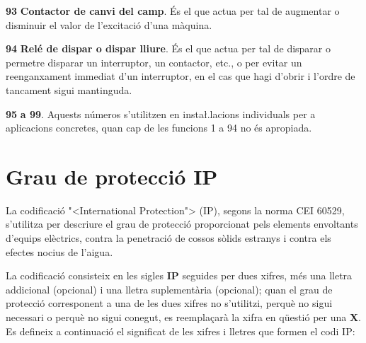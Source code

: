 \begin{multicols}{2}
\begin{list}{}
\item[\textbf{93}]   
\textbf{Contactor de canvi del camp}. \'{E}s el
que actua per tal de augmentar o disminuir el valor de l'excitaci\'{o}
d'una m\`{a}quina.

\item[\textbf{94}]   
\textbf{Rel\'{e} de dispar o dispar
lliure}. \'{E}s el que actua per tal de disparar o permetre disparar un
interruptor, un contactor, etc., o per evitar un reenganxament
immediat d'un interruptor, en el cas que hagi d'obrir i l'ordre de
tancament sigui mantinguda.

\item[\textbf{95}] \textbf{a 99}. Aquests n\'{u}meros s'utilitzen en insta{\l.l}acions
individuals per a aplicacions concretes, quan cap de les funcions 1
a 94 no \'{e}s apropiada.

\end{list}
\end{multicols}


\section{Grau de protecci\'{o} IP}   

La codificaci\'{o} {"<}International Protection{">} (\textsf{IP}), segons la
norma \textsf{CEI 60529}, s'utilitza per descriure el grau de
protecci\'{o}  proporcionat pels elements envoltants d'equips el\`{e}ctrics, contra
la penetraci\'{o} de cossos s\`{o}lids estranys i contra els efectes nocius
de l'aigua.

La codificaci\'{o} consisteix en les sigles \textsf{\textbf{IP}}
seguides per dues xifres, m\'{e}s una lletra addicional (opcional) i una
lletra suplement\`{a}ria (opcional); quan el grau de protecci\'{o}
corresponent a una de les dues xifres no s'utilitzi, perqu\`{e} no sigui
necessari o perqu\`{e} no sigui conegut, es reempla\c{c}ar\`{a} la xifra en
q\"{u}esti\'{o} per una \textsf{\textbf{X}}. Es defineix a continuaci\'{o} el
significat de les xifres i lletres que formen el codi \textsf{IP}:

